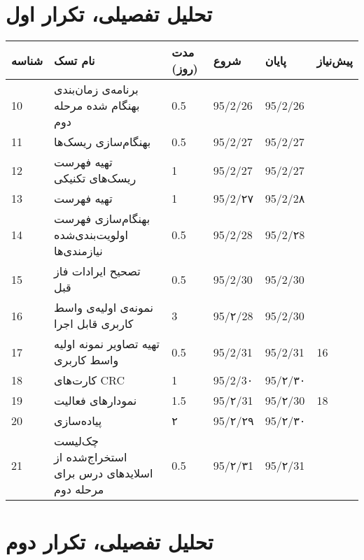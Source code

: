 \section{تحلیل تفصیلی، تکرار اول}	
\begin{tabular}[H]{ | l | l | l | l | l | l | }
	\hline
	شناسه & نام تسک & مدت (روز) & شروع & پایان & پیش‌نیاز    \\ \hline
	10 & برنامه‌ی زمان‌بندی‌ بهنگام شده مرحله دوم & 0.5   &   95/2/26 &   95/2/26 &      \\ \hline
	11 & بهنگام‌سازی ریسک‌ها & 0.5   &   95/2/27 &   95/2/27 &      \\ \hline
	12 & تهیه  فهرست ریسک‌های تکنیکی & 1   &   95/2/27 &   95/2/27 &      \\ \hline
	13 & تهیه فهرست \lr{Architecturally Significant Requirements} & 1   &   95/2/۲۷ &   95/2/2۸ &      \\ \hline
	14 &  بهنگام‌سازی فهرست اولویت‌بندی‌شده نیازمندی‌ها & 0.5   &   95/2/28 &   95/2/۲8 &      \\ \hline
	15&  تصحیح ایرادات فاز قبل & 0.5   &   95/2/30 &   95/2/30 &      \\ \hline
	16 & نمونه‌ی اولیه‌ی واسط کاربری قابل اجرا & 3 &   95/۲/28 &   95/2/30 &  \\ \hline
	17 & تهیه تصاویر نمونه اولیه واسط کاربری  & 0.5 & 95/2/31 &   95/2/31 & 16 \\ \hline
	18 & کارت‌های CRC & 1   &   95/2/3۰ &   95/۲/۳۰ &      \\ \hline
	19 & نمودارهای فعالیت  & 1.5  &   95/۲/31 &   95/۲/30 &   18   \\ \hline
	20 & پیاده‌سازی \lr{Executable Architectural Baseline} & ۲   &   95/۲/۲۹ &   95/۲/۳۰ &      \\ \hline
	21 &  چک‌لیست استخراج‌شده از اسلایدهای درس برای مرحله دوم &  0.5 &   95/۲/۳1 &   95/۲/31 &  \\ \hline
\end{tabular}

\newpage
\section{تحلیل تفصیلی، تکرار دوم}

